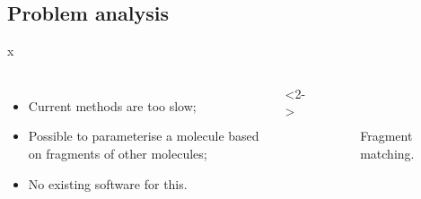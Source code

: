 \documentclass{beamer}
\newlength{\wideitemsep}
\let\olditem\item
\renewcommand{\item}[1][\wideitemsep]{\setlength{\itemsep}{#1}\olditem}
\begin{document}
\subsection{Problem analysis}
\begin{frame}{x}{}
  \begin{columns}
    \begin{itemize}
     \item<1-> Current methods are too slow;
     \item<2-> Possible to parameterise a molecule based on fragments of other molecules;
     \item<3-> No existing software for this.
    \end{itemize}

   <2->
    \begin{figure}
     \vspace{-1em}
     \\[.3cm]
     \qquad
     \vspace{-.2cm}
     \caption{Fragment matching.}
    \end{figure}
  \end{columns}
\end{frame}
\end{document}
